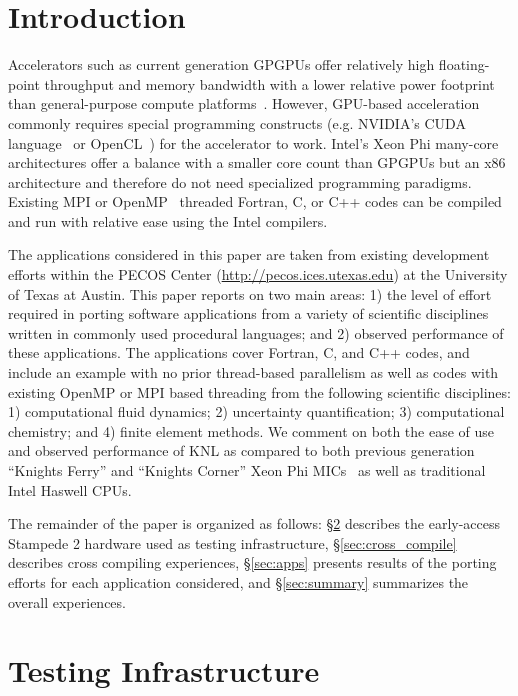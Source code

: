 \section{Introduction}
\label{sec:intro}

Accelerators such as current generation GPGPUs offer relatively high
floating-point throughput and memory bandwidth with a lower relative power
footprint than general-purpose compute platforms~\cite{gpu_hpc:2009}. However,
GPU-based acceleration commonly requires special programming constructs (e.g.
NVIDIA's CUDA language~\cite{nvidia2010programming} or
OpenCL~\cite{opencl_spec}) for the accelerator to work.
Intel's Xeon Phi many-core architectures offer a balance with a smaller core
count than GPGPUs
but an x86 architecture and therefore do not need specialized programming
paradigms.  Existing MPI or OpenMP~\cite{openmp_standard} threaded Fortran, C,
or C++ codes can be compiled and run with relative ease using the Intel compilers.

The applications considered in this paper are taken from existing development
efforts within the PECOS Center (\url{http://pecos.ices.utexas.edu}) at the
University of Texas at Austin.  This paper reports on two main areas: 1) the
level of effort required in porting software applications from a variety of
scientific disciplines written in commonly used procedural languages; and 2)
observed performance of these applications.  The applications cover Fortran, C,
and C++ codes, and include an example with no prior thread-based parallelism as
well as codes with existing OpenMP or MPI based threading from the following
scientific disciplines: 1) computational fluid dynamics; 2) uncertainty
quantification; 3) computational chemistry; and 4) finite element methods.  We
comment on both the ease of use and observed performance of KNL as
compared to both previous generation ``Knights Ferry'' and ``Knights Corner'' Xeon
Phi MICs~\cite{schulz2012early} as well as traditional Intel Haswell CPUs.

The remainder of the paper is organized as follows: \S\ref{sec:hardware}
describes the early-access Stampede 2 hardware used as testing infrastructure,
\S\ref{sec:cross_compile} describes cross compiling experiences,
\S\ref{sec:apps} presents results of the porting efforts for each application
considered, and \S\ref{sec:summary} summarizes the overall experiences.

\section{Testing Infrastructure}
\label{sec:hardware}


